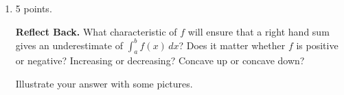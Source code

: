 \documentclass{article}
\begin{document}
\begin{enumerate}
\begin{enumerate}
  \end{enumerate}

\item 

\begin{grading}
5 points. 
\end{grading}

\begin{problem}[\stretch{3}]
    {\bf Reflect Back.}  What characteristic of $f$ will ensure that a
    right hand sum gives an underestimate of $\displaystyle \int_a^b f(x)
    \, dx $?  Does it matter whether $f$ is positive or negative?
    Increasing or decreasing? Concave up or concave down?

    Illustrate your answer with some pictures.       
  \end{problem}


\end{enumerate}
\end{document}

